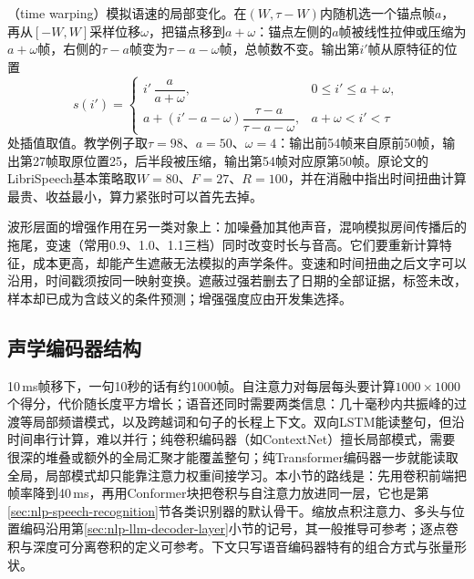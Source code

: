 （time warping）模拟语速的局部变化。在$(W,\tau-W)$内随机选一个锚点帧$a$，再从$[-W,W]$采样位移$\omega$，把锚点移到$a+\omega$：锚点左侧的$a$帧被线性拉伸或压缩为$a+\omega$帧，右侧的$\tau-a$帧变为$\tau-a-\omega$帧，总帧数不变。输出第$i'$帧从原特征的位置
\begin{equation}
 s(i')=
 \begin{cases}
  i'\,\dfrac{a}{a+\omega}, & 0\leq i'\leq a+\omega,\\[2mm]
  a+(i'-a-\omega)\dfrac{\tau-a}{\tau-a-\omega}, & a+\omega< i'<\tau
 \end{cases}
 \label{eq:nlp-speech-time-warp}
\end{equation}
处插值取值。教学例子取$\tau=98$、$a=50$、$\omega=4$：输出前54帧来自原前50帧，输出第27帧取原位置25，后半段被压缩，输出第54帧对应原第50帧。原论文的LibriSpeech基本策略取$W=80$、$F=27$、$R=100$，并在消融中指出时间扭曲计算最贵、收益最小，算力紧张时可以首先去掉。

波形层面的增强作用在另一类对象上：加噪叠加其他声音，混响模拟房间传播后的拖尾，变速（常用0.9、1.0、1.1三档）同时改变时长与音高。它们要重新计算特征，成本更高，却能产生遮蔽无法模拟的声学条件。变速和时间扭曲之后文字可以沿用，时间戳须按同一映射变换。遮蔽过强若删去了日期的全部证据，标签未改，样本却已成为含歧义的条件预测；增强强度应由开发集选择。

\subsection{声学编码器结构}
\label{sec:nlp-speech-encoder}

10\,ms帧移下，一句10秒的话有约1000帧。自注意力对每层每头要计算$1000\times1000$个得分，代价随长度平方增长；语音还同时需要两类信息：几十毫秒内共振峰的过渡等局部频谱模式，以及跨越词和句子的长程上下文。双向LSTM能读整句，但沿时间串行计算，难以并行；纯卷积编码器（如ContextNet）擅长局部模式，需要很深的堆叠或额外的全局汇聚才能覆盖整句\cite{nlp-speech-han2020contextnet}；纯Transformer编码器一步就能读取全局，局部模式却只能靠注意力权重间接学习。本小节的路线是：先用卷积前端把帧率降到40\,ms，再用Conformer块把卷积与自注意力放进同一层\cite{nlp-speech-gulati2020conformer}，它也是第\ref{sec:nlp-speech-recognition}节各类识别器的默认骨干。缩放点积注意力、多头与位置编码沿用第\ref{sec:nlp-llm-decoder-layer}小节的记号，其一般推导可参考；逐点卷积与深度可分离卷积的定义可参考。下文只写语音编码器特有的组合方式与张量形状。

